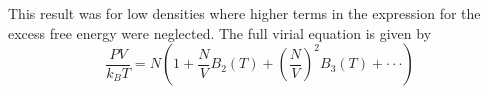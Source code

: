 \documentclass[12pt]{article}
\begin{document}
\color{red}This result was for low densities where higher terms in the expression for the excess free energy were neglected. The full virial equation is given by\color{black}
\begin{equation}\frac{PV}{k_BT}=N\left(1+\frac{N}{V}B_2(T)+\left(\frac{N}{V}\right)^2B_3(T)+ \cdot\cdot\cdot\right) \end{equation}



\cite{fake}



\end{document}

